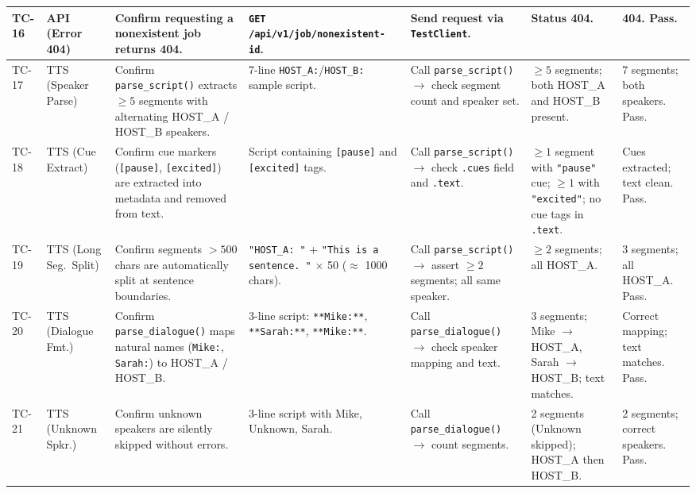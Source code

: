 \documentclass[sigconf,natbib=false]{acmart}   %
\begin{document}
{\begin{longtable}{|p{0.6cm}|p{1.4cm}|p{2.0cm}|p{2.3cm}|p{2.3cm}|p{2.3cm}|p{2.3cm}|}
TC-16 & API (Error 404) & Confirm requesting a nonexistent job returns 404. & \texttt{GET /api/v1/job/nonexistent-id}. & Send request via \texttt{TestClient}. & Status 404. & 404. Pass.\\
\hline

TC-17 & TTS (Speaker Parse) & Confirm \texttt{parse\_script()} extracts $\ge 5$ segments with alternating HOST\_A / HOST\_B speakers. & 7-line \texttt{HOST\_A:}/\texttt{HOST\_B:} sample script. & Call \texttt{parse\_script()} $\to$ check segment count and speaker set. & $\ge 5$ segments; both HOST\_A and HOST\_B present. & 7 segments; both speakers. Pass.\\
\hline

TC-18 & TTS (Cue Extract) & Confirm cue markers (\texttt{[pause]}, \texttt{[excited]}) are extracted into metadata and removed from text. & Script containing \texttt{[pause]} and \texttt{[excited]} tags. & Call \texttt{parse\_script()} $\to$ check \texttt{.cues} field and \texttt{.text}. & $\ge 1$ segment with \texttt{"pause"} cue; $\ge 1$ with \texttt{"excited"}; no cue tags in \texttt{.text}. & Cues extracted; text clean. Pass.\\
\hline

TC-19 & TTS (Long Seg.\ Split) & Confirm segments $> 500$ chars are automatically split at sentence boundaries. & \texttt{"HOST\_A: "} + \texttt{"This is a sentence.\ "} $\times$ 50 ($\approx$ 1000 chars). & Call \texttt{parse\_script()} $\to$ assert $\ge 2$ segments; all same speaker. & $\ge 2$ segments; all HOST\_A. & 3 segments; all HOST\_A. Pass.\\
\hline

TC-20 & TTS (Dialogue Fmt.) & Confirm \texttt{parse\_dialogue()} maps natural names (\texttt{Mike:}, \texttt{Sarah:}) to HOST\_A / HOST\_B. & 3-line script: \texttt{**Mike:**}, \texttt{**Sarah:**}, \texttt{**Mike:**}. & Call \texttt{parse\_dialogue()} $\to$ check speaker mapping and text. & 3 segments; Mike $\to$ HOST\_A, Sarah $\to$ HOST\_B; text matches. & Correct mapping; text matches. Pass.\\
\hline

TC-21 & TTS (Unknown Spkr.) & Confirm unknown speakers are silently skipped without errors. & 3-line script with Mike, Unknown, Sarah. & Call \texttt{parse\_dialogue()} $\to$ count segments. & 2 segments (Unknown skipped); HOST\_A then HOST\_B. & 2 segments; correct speakers. Pass.\\
\hline

\end{longtable}
}
\end{document}

